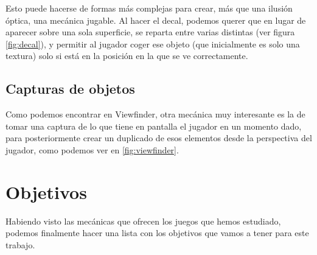 
Esto puede hacerse de formas más complejas para crear, más que una ilusión óptica, una mecánica jugable. Al hacer el decal, podemos querer que en lugar de aparecer sobre una sola superficie, se reparta entre varias distintas (ver figura \ref{fig:decal}), y permitir al jugador coger ese objeto (que inicialmente es solo una textura) solo si está en la posición en la que se ve correctamente.



\subsection{Capturas de objetos}
Como podemos encontrar en Viewfinder, otra mecánica muy interesante es la de tomar una captura de lo que tiene en pantalla el jugador en un momento dado, para posteriormente crear un duplicado de esos elementos desde la perspectiva del jugador, como podemos ver en \ref{fig:viewfinder}.


\section{Objetivos}
\label{sec:estadoDeLaCuestion/Objetivos}
Habiendo visto las mecánicas que ofrecen los juegos que hemos estudiado, podemos finalmente hacer una lista con los objetivos que vamos a tener para este trabajo.

